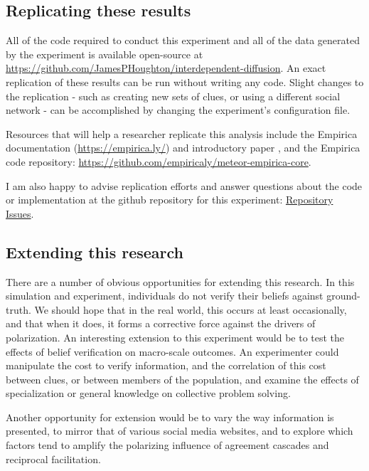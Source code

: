\documentclass{article}
\begin{document}
\subsection{Replicating these results}

All of the code required to conduct this experiment and all of the data generated by the experiment is available open-source at \href{https://github.com/JamesPHoughton/interdependent-diffusion}{https://github.com/JamesPHoughton/interdependent-diffusion}. An exact replication of these results can be run without writing any code. Slight changes to the replication - such as creating new sets of clues, or using a different social network - can be accomplished by changing the experiment's configuration file. 

Resources that will help a researcher replicate this analysis include the Empirica documentation (\href{https://empirica.ly/}{https://empirica.ly/}) and introductory paper \cite{almaatouq2021empirica}, and the Empirica code repository: \href{https://github.com/empiricaly/meteor-empirica-core}{https://github.com/empiricaly/meteor-empirica-core}. 

I am also happy to advise replication efforts and answer questions about the code or implementation at the github repository for this experiment: \href{https://github.com/JamesPHoughton/interdependent-diffusion/issues}{Repository Issues}.

\subsection{Extending this research}
There are a number of obvious opportunities for extending this research. In this simulation and experiment, individuals do not verify their beliefs against ground-truth. We should hope that in the real world, this occurs at least occasionally, and that when it does, it forms a corrective force against the drivers of polarization. An interesting extension to this experiment would be to test the effects of belief verification on macro-scale outcomes. An experimenter could manipulate the cost to verify information, and the correlation of this cost between clues, or between members of the population, and examine the effects of specialization or general knowledge on collective problem solving.

Another opportunity for extension would be to vary the way information is presented, to mirror that of various social media websites, and to explore which factors tend to amplify the polarizing influence of agreement cascades and reciprocal facilitation. 
\end{document}
